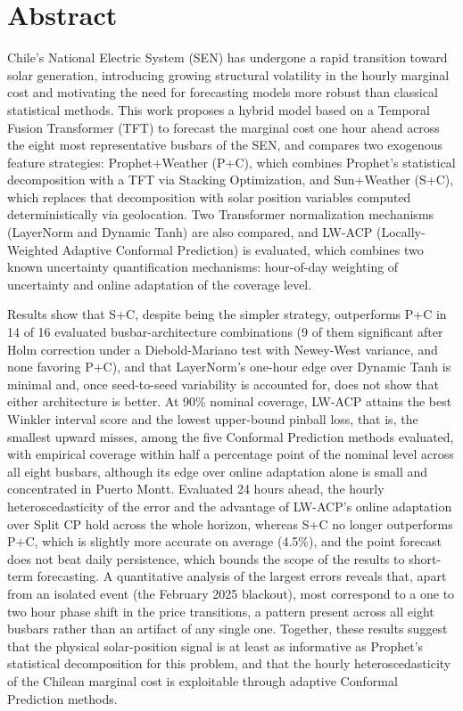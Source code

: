 \documentclass{umemoria}
\begin{document}
\chapter*{Abstract}
Chile's National Electric System (SEN) has undergone a rapid transition toward solar generation, introducing growing structural volatility in the hourly marginal cost and motivating the need for forecasting models more robust than classical statistical methods. This work proposes a hybrid model based on a Temporal Fusion Transformer (TFT) to forecast the marginal cost one hour ahead across the eight most representative busbars of the SEN, and compares two exogenous feature strategies: Prophet+Weather (P+C), which combines Prophet's statistical decomposition with a TFT via Stacking Optimization, and Sun+Weather (S+C), which replaces that decomposition with solar position variables computed deterministically via geolocation. Two Transformer normalization mechanisms (LayerNorm and Dynamic Tanh) are also compared, and LW-ACP (Locally-Weighted Adaptive Conformal Prediction) is evaluated, which combines two known uncertainty quantification mechanisms: hour-of-day weighting of uncertainty and online adaptation of the coverage level.

Results show that S+C, despite being the simpler strategy, outperforms P+C in 14 of 16 evaluated busbar-architecture combinations (9 of them significant after Holm correction under a Diebold-Mariano test with Newey-West variance, and none favoring P+C), and that LayerNorm's one-hour edge over Dynamic Tanh is minimal and, once seed-to-seed variability is accounted for, does not show that either architecture is better. At 90\% nominal coverage, LW-ACP attains the best Winkler interval score and the lowest upper-bound pinball loss, that is, the smallest upward misses, among the five Conformal Prediction methods evaluated, with empirical coverage within half a percentage point of the nominal level across all eight busbars, although its edge over online adaptation alone is small and concentrated in Puerto Montt. Evaluated 24 hours ahead, the hourly heteroscedasticity of the error and the advantage of LW-ACP's online adaptation over Split CP hold across the whole horizon, whereas S+C no longer outperforms P+C, which is slightly more accurate on average (4.5\%), and the point forecast does not beat daily persistence, which bounds the scope of the results to short-term forecasting. A quantitative analysis of the largest errors reveals that, apart from an isolated event (the February 2025 blackout), most correspond to a one to two hour phase shift in the price transitions, a pattern present across all eight busbars rather than an artifact of any single one. Together, these results suggest that the physical solar-position signal is at least as informative as Prophet's statistical decomposition for this problem, and that the hourly heteroscedasticity of the Chilean marginal cost is exploitable through adaptive Conformal Prediction methods.
\vfill\null
\end{document}
